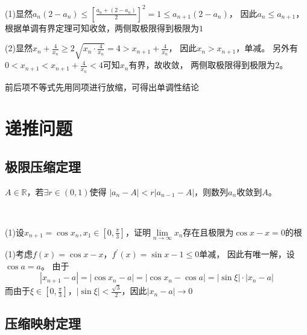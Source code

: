 \begin{solution}
  (1)显然$a_n(2 - a_n) \leq \left[ \frac{a_n + (2 - a_n)}{2} \right]^2 = 1 \leq a_{n+1}(2 - a_n)$，
  因此$a_n \leq a_{n+1}$，根据单调有界定理可知收敛，两侧取极限得到极限为$1$

  (2)显然$x_n + \frac{4}{x_n} \geq 2 \sqrt{x_n \cdot \frac{4}{x_n}} = 4 > x_{n+1} + \frac{4}{x_n}$，
  因此$x_n > x_{n+1}$，单减。
  另外有$0 < x_{n+1} < x_{n+1} + \frac{4}{x_n} < 4$可知$x_n$有界，故收敛，
  两侧取极限得到极限为$2$。
\end{solution}

\begin{note}
  前后项不等式先用同项进行放缩，可得出单调性结论
\end{note}

\section{递推问题}


\subsection{极限压缩定理}

\begin{theorem}[极限压缩定理]
  $A \in \mathbb{R}$，若$\exists r \in (0,1)$使得
  $|a_n - A| < r|a_{n-1} - A|$，则数列$a_n $收敛到$A$。
\end{theorem}

~

\begin{exercise}[经典极限压缩定理题]
  (1)设$x_{n+1} = \cos x_n, x_1 \in [0, \frac{\pi}{3}]$，证明$\lim \limits _{n \rightarrow \infty} x_n$存在且极限为$\cos x - x = 0$的根
\end{exercise}

\begin{solution}
  (1)考虑$f(x) = \cos x - x$，$f^{\prime}(x) = \sin x - 1 \leq 0$单减，
  因此有唯一解，设$\cos a = a$。
  由于
  \begin{equation*}
    |x_{n+1} - a| = |\cos x_n - a| = |\cos x_n - \cos a| = |\sin \xi| \cdot |x_n - a|
  \end{equation*}
  而由于$\xi \in [0,\frac{\pi}{3}]$，$|\sin \xi| < \frac{\sqrt{3}}{2}$，因此$|x_n - a| \rightarrow 0$
\end{solution}



\subsection{压缩映射定理}

